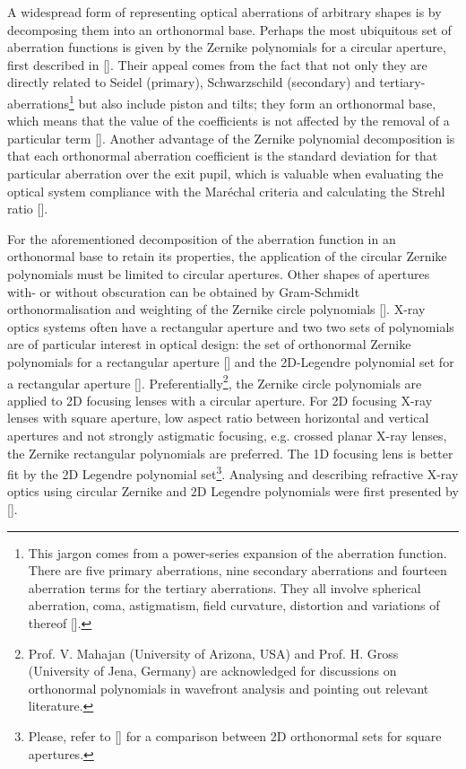 \begin{refsection}
A widespread form of representing optical aberrations of arbitrary shapes is by decomposing them into an orthonormal base. Perhaps the most ubiquitous set of aberration functions is given by the Zernike polynomials for a circular aperture, first described in [\cite{Zernike1934}]. Their appeal comes from the fact that not only they are directly related to Seidel (primary), Schwarzschild (secondary) and tertiary-aberrations\footnote{This jargon comes from a power-series expansion of the aberration function. There are five primary aberrations, nine secondary aberrations and fourteen aberration terms for the tertiary aberrations. They all involve spherical aberration, coma, astigmatism, field curvature, distortion and variations of thereof [\cite{Mahajan2013}].} but also include piston and tilts; they form an orthonormal base, which means that the value of the coefficients is not affected by the removal of a particular term [\cite{Mahajan2007}]. Another advantage of the Zernike polynomial decomposition is that each orthonormal aberration coefficient is the standard deviation for that particular aberration over the exit pupil, which is valuable when evaluating the optical system compliance with the  Mar\'echal criteria and calculating the Strehl ratio [\cite{Mahajan1983}].

For the aforementioned decomposition of the aberration function in an orthonormal base to retain its properties, the application of the circular Zernike polynomials must be limited to circular apertures. Other shapes of apertures with- or without obscuration can be obtained by Gram-Schmidt orthonormalisation and weighting of the Zernike circle polynomials [\cite{Swantner1994,Mahajan1995}]. X-ray optics systems often have a rectangular aperture and two two sets of polynomials are of particular interest in optical design: the set of orthonormal Zernike polynomials for a rectangular aperture  [\cite{Mahajan2007, Mahajan2012}] and the 2D-Legendre polynomial set for a rectangular aperture [\cite{Mahajan2010}]. Preferentially\footnote{Prof. V. Mahajan (University of Arizona, USA) and Prof. H. Gross (University of Jena, Germany) are acknowledged for discussions on orthonormal polynomials in wavefront analysis and pointing out relevant literature.}, the Zernike circle polynomials are applied to 2D focusing lenses with a circular aperture. For 2D focusing X-ray lenses with square aperture, low aspect ratio between horizontal and vertical apertures and not strongly astigmatic focusing, e.g. crossed planar X-ray lenses, the Zernike rectangular polynomials are preferred. The 1D focusing lens is better fit by the 2D Legendre polynomial set\footnote{Please, refer to [\cite{Ye2014}] for a comparison between 2D orthonormal sets for square apertures.}. Analysing and describing refractive X-ray optics using circular Zernike and 2D Legendre polynomials were first presented by [\cite{Koch2016}]. 


\end{refsection}
